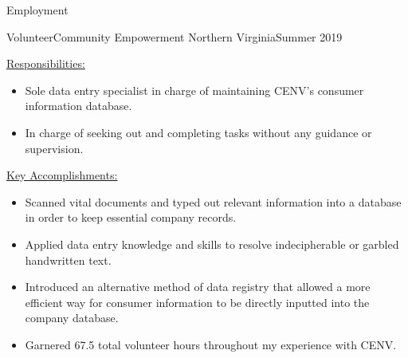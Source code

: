 \documentclass[]{cv}
\begin{document}
	\begin{cvsection}{Employment}
		\begin{cvsubsection}{Volunteer}{Community Empowerment Northern Virginia}{Summer 2019}
			\begin{cvsubsection}{\underline{Responsibilities:}}{}{}
			\begin{itemize}
				\item Sole data entry specialist in charge of maintaining CENV’s consumer information database.
				\item In charge of seeking out and completing tasks without any guidance or supervision.
			\end{itemize}
			\end{cvsubsection}
			\begin{cvsubsection}{\underline{Key Accomplishments:}}{}{}
			\begin{itemize}
				\item Scanned vital documents and typed out relevant information into a database in order to keep essential company records.
				\item Applied data entry knowledge and skills to resolve indecipherable or garbled handwritten text.
				\item Introduced an alternative method of data registry that allowed a more efficient way for consumer information to be directly inputted into the company database.
				\item Garnered 67.5 total volunteer hours throughout my experience with CENV.
			\end{itemize}
			\end{cvsubsection}
		\end{cvsubsection}
		

\end{cvsection}
\end{document}

